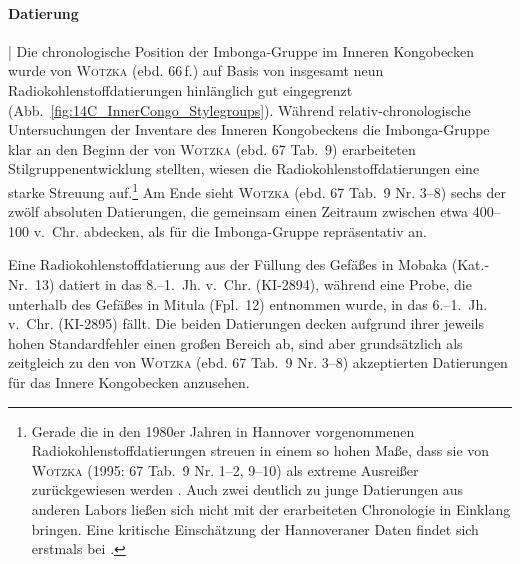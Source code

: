 \paragraph{Datierung}\hspace{-.5em}|\hspace{.5em}%
Die chronologische Position der Imbonga-Gruppe im Inneren Kongobecken wurde von \textsc{Wotzka} (ebd. 66\,f.) auf Basis von insgesamt neun Radiokohlenstoffdatierungen hinlänglich gut eingegrenzt (Abb.~\ref{fig:14C_InnerCongo_Stylegroups}). Während relativ-chronologische Untersuchungen der Inventare des Inneren Kongobeckens die Imbonga-Gruppe klar an den Beginn der von \textsc{Wotzka} (ebd. 67 Tab.~9) erarbeiteten Stilgruppenentwicklung stellten, wiesen die Radiokohlenstoffdatierungen eine starke Streuung auf.\footnote{Gerade die in den 1980er Jahren in Hannover vorgenommenen Radiokohlenstoffdatierungen streuen in einem so hohen Maße, dass sie von \textsc{Wotzka} (1995: 67 Tab.~9 Nr. 1--2, 9--10) als extreme Ausreißer zurückgewiesen werden \parencite[siehe][]{Geyh.1990}. Auch zwei deutlich zu junge Datierungen aus anderen Labors \parencite[67 Tab.~9 Nr. 11--12]{Wotzka.1995} ließen sich nicht mit der erarbeiteten Chronologie in Einklang bringen. Eine kritische Einschätzung der Hannoveraner Daten findet sich erstmals bei \textcite[132\,f.]{Eggert.1987c}.} Am Ende sieht \textsc{Wotzka} (ebd. 67 Tab.~9 Nr. 3--8) sechs der zwölf absoluten Datierungen, die gemeinsam einen Zeitraum zwischen etwa 400--100 v.~Chr. abdecken, als für die Imbonga-Gruppe repräsentativ an.

Eine Radiokohlenstoffdatierung aus der Füllung des Gefäßes in Mobaka (Kat.-Nr.~13) datiert in das \mbox{8.--1.~Jh.} v.~Chr. (KI-2894), während eine Probe, die unterhalb des Gefäßes in Mitula (Fpl.~12) entnommen wurde, in das 6.--1.~Jh. v.~Chr. (KI-2895) fällt. Die beiden Datierungen decken aufgrund ihrer jeweils hohen Standardfehler einen großen Bereich ab, sind aber grundsätzlich als zeitgleich zu den von \textsc{Wotzka} (ebd. 67 Tab.~9 Nr. 3--8) akzeptierten Datierungen für das Innere Kongobecken anzusehen. 


